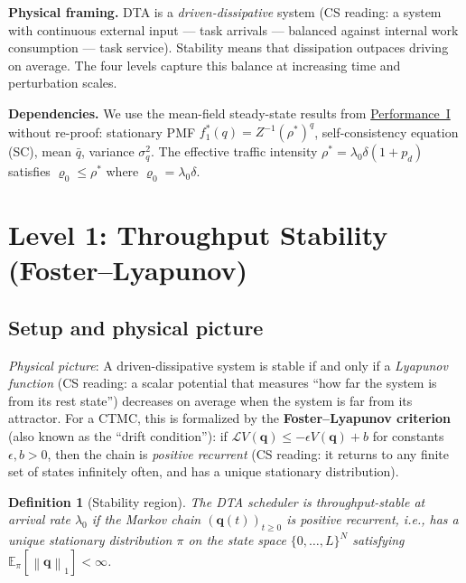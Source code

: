 \documentclass[11pt,a4paper]{report}
\newtheorem{definition}{Definition}[section]
\newcommand{\norm}[1]{\left\lVert #1 \right\rVert}
\newcommand{\rhostar}{\rho^{*}}
\newcommand{\rhozero}{\varrho_0}
\newcommand{\lambdazero}{\lambda_0}
\newcommand{\pd}{p_d}
\newcommand{\qbar}{\bar{q}}
\newcommand{\generator}{\mathcal{L}}
\begin{document}
\noindent\textbf{Physical framing.}
DTA is a \emph{driven-dissipative} system
(CS reading: a system with continuous external input --- task arrivals ---
balanced against internal work consumption --- task service).
Stability means that dissipation outpaces driving on average.
The four levels capture this balance at increasing time and perturbation scales.

\noindent\textbf{Dependencies.}
We use the mean-field steady-state results from \hyperref[chap:load_balance]{Performance~I}
without re-proof: stationary PMF $f_1^*(q) = Z^{-1}(\rhostar)^q$,
self-consistency equation (SC), mean $\qbar$, variance $\sigma_q^2$.
The effective traffic intensity $\rhostar = \lambdazero\delta(1+\pd)$
satisfies $\rhozero \leq \rhostar$ where $\rhozero = \lambdazero\delta$.

\section{Level 1: Throughput Stability (Foster--Lyapunov)}

\subsection{Setup and physical picture}

\emph{Physical picture}:
A driven-dissipative system is stable if and only if a
\emph{Lyapunov function} (CS reading: a scalar potential that measures
``how far the system is from its rest state'') decreases on average
when the system is far from its attractor.
For a CTMC, this is formalized by the \textbf{Foster--Lyapunov criterion}
(also known as the ``drift condition''):
if $\generator V(\mathbf{q}) \leq -\epsilon V(\mathbf{q}) + b$
for constants $\epsilon, b > 0$, then the chain is
\emph{positive recurrent} (CS reading: it returns to any finite set
of states infinitely often, and has a unique stationary distribution).

\begin{definition}[Stability region]
\label{def:stable}
The DTA scheduler is \emph{throughput-stable} at arrival rate
$\lambdazero$ if the Markov chain $(\mathbf{q}(t))_{t\geq 0}$
is positive recurrent, i.e., has a unique stationary distribution
$\pi$ on the state space $\{0,\ldots,L\}^N$ satisfying
$\mathbb{E}_\pi[\norm{\mathbf{q}}_1] < \infty$.
\end{definition}
\end{document}
